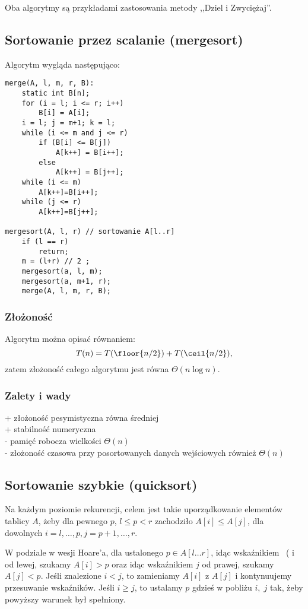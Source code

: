 Oba algorytmy są przykładami zastosowania metody ,,Dziel i Zwyciężaj''.

\subsection{Sortowanie przez scalanie (mergesort)}
Algorytm wygląda następująco:
\begin{verbatim}
merge(A, l, m, r, B):
    static int B[n];
    for (i = l; i <= r; i++)
        B[i] = A[i];
    i = l; j = m+1; k = l;
    while (i <= m and j <= r)
        if (B[i] <= B[j])
            A[k++] = B[i++];
        else
            A[k++] = B[j++];
    while (i <= m)
        A[k++]=B[i++];
    while (j <= r)
        A[k++]=B[j++];

mergesort(A, l, r) // sortowanie A[l..r]
    if (l == r)
        return;
    m = (l+r) // 2 ;
    mergesort(a, l, m);
    mergesort(a, m+1, r);
    merge(A, l, m, r, B);
\end{verbatim}

\subsubsection*{Złożoność}
Algorytm można opisać równaniem:
\[ T(n) = T( \floor{n/2}) + T(\ceil{n/2}), \]
zatem złożoność całego algorytmu jest równa \( \Theta(n \log n) \).

\subsubsection*{Zalety i wady}
+ złożoność pesymistyczna równa średniej \\
+ stabilność numeryczna \\
- pamięć robocza wielkości \( \Theta(n) \) \\
- złożoność czasowa przy posortowanych danych wejściowych również \( \Theta(n) \)

\subsection{Sortowanie szybkie (quicksort)}
Na każdym poziomie rekurencji, celem jest takie uporządkowanie elementów tablicy \( A \), żeby dla pewnego \( p \), \( l \leq p < r \)
zachodziło \( A[i] \leq A[j] \), dla dowolnych \( i = l, \dots, p, j = p+1, \dots, r \).

W podziale w wesji Hoare'a, dla ustalonego \( p \in A[l \dots r] \), idąc wskaźnikiem \ ( i \) od lewej, szukamy \( A[i] > p \) oraz idąc wskaźnikiem \( j \) od prawej, szukamy \( A[j] < p \).
Jeśli znalezione \( i < j \), to zamieniamy \( A[i] \) z \( A[j] \) i kontynuujemy przesuwanie wskaźników. Jeśli \( i \geq j \), to ustalamy \( p \) gdzieś w pobliżu \( i,\; j \) tak, żeby powyższy warunek był spełniony.

